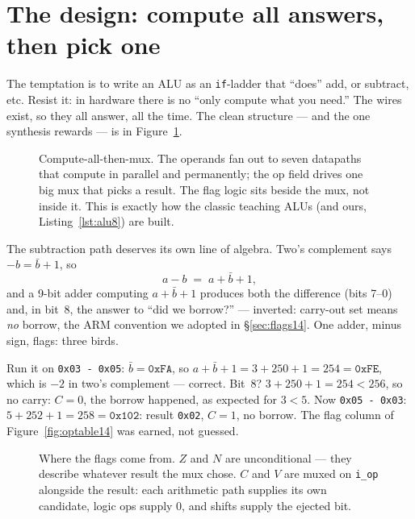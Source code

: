 \section{The design: compute all answers, then pick one}
\label{sec:design14}

The temptation is to write an ALU as an \texttt{if}-ladder that
``does'' add, or subtract, etc. Resist it: in hardware there is no
``only compute what you need.'' The wires exist, so they all answer,
all the time. The clean structure --- and the one synthesis rewards
--- is in Figure~\ref{fig:structure14}.

\begin{figure}[htbp]
\centering

\caption{Compute-all-then-mux. The operands fan out to seven datapaths
that compute in parallel and permanently; the op field drives one big
mux that picks a result. The flag logic sits beside the mux, not
inside it. This is exactly how the classic teaching ALUs (and ours,
Listing~\ref{lst:alu8}) are built.}
\label{fig:structure14}
\end{figure}

The subtraction path deserves its own line of algebra. Two's
complement says $-b=\bar b+1$, so
\[
a-b \;=\; a+\bar b+1,
\]
and a 9-bit adder computing $a+\bar b+1$ produces both the difference
(bits 7--0) and, in bit~8, the answer to ``did we borrow?'' ---
inverted: carry-out set means \emph{no} borrow, the ARM convention we
adopted in \S\ref{sec:flags14}. One adder, minus sign, flags: three
birds.

\begin{example}
Run it on \texttt{0x03 - 0x05}: $\bar b=\texttt{0xFA}$, so
$a+\bar b+1 = 3+250+1 = 254 = \texttt{0xFE}$, which is $-2$ in two's
complement --- correct. Bit~8? $3+250+1=254<256$, so no carry:
$C=0$, the borrow happened, as expected for $3<5$. Now
\texttt{0x05 - 0x03}: $5+252+1=258=\texttt{0x102}$: result
\texttt{0x02}, $C=1$, no borrow. The flag column of
Figure~\ref{fig:optable14} was earned, not guessed.
\end{example}

\begin{figure}[htbp]
\centering

\caption{Where the flags come from. $Z$ and $N$ are unconditional ---
they describe whatever result the mux chose. $C$ and $V$ are muxed on
\texttt{i\_op} alongside the result: each arithmetic path supplies its
own candidate, logic ops supply 0, and shifts supply the ejected bit.}
\label{fig:flags14}
\end{figure}

